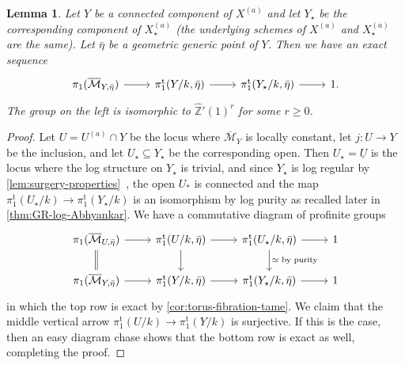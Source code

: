 \documentclass[a4paper,twoside,11pt,reqno]{amsart}
\renewcommand{\mathbb}{\mathds}
\newcommand{\cM}{{\mathcal M}}
\newcommand{\pitame}{\pi_1^{\mathrm{t}}}
\newtheorem{lem}[thm]{Lemma}
\theoremstyle{definition}
\numberwithin{equation}{subsection}
\begin{document}
\begin{lem} \label{lem:right-exact-Xa}
    Let $Y$ be a connected component of $X^{(a)}$ and let $Y_\star$ be the corresponding component of $X^{(a)}_\star$ (the underlying schemes of $X^{(a)}$ and $X^{(a)}_\star$ are the same). Let $\bar\eta$ be a geometric generic point of $Y$. Then we have an exact sequence
    \[
        \begin{tikzcd}
            \pi_1(\overline{\cM}_{Y,\bar\eta}) \ar[r] & \pitame(Y/k,\bar\eta)\ar[r] & \pitame(Y_\star/k,\bar\eta)\ar[r] & 1.
        \end{tikzcd}
    \]
    The group on the left is isomorphic to $\widehat{\mathbb{Z}}'(1)^r$ for some $r\geq 0$. 
\end{lem}

\begin{proof}
Let $U=U^{(a)}\cap Y$ be the locus where $\overline{\cM}_Y$ is locally constant, let $j\colon U\to Y$ be the inclusion, and let $U_\star\subseteq Y_\star$ be the corresponding open. Then $U_\star=\underline{U}$ is the locus where the log structure on $Y_\star$ is trivial, and since $Y_\star$ is log regular by \cref{lem:surgery-properties}~, the open $U_\ast$ is connected and the map $\pitame(U_\star/k)\to \pitame(Y_\star/k)$ is an isomorphism by log purity as recalled later in \cref{thm:GR-log-Abhyankar}. We have a commutative diagram of profinite groups
\[
    \begin{tikzcd}
            \pi_1(\overline{\cM}_{U,\bar\eta}) \ar[r] \ar[d,equal] & \pitame(U/k,\bar\eta)\ar[r] \ar[d] & \pitame(U_\star/k,\bar\eta)\ar[r] \ar[d,"\simeq\text{ by purity}"] & 1 \\
            \pi_1(\overline{\cM}_{Y,\bar\eta}) \ar[r] & \pitame(Y/k,\bar\eta)\ar[r] & \pitame(Y_\star/k,\bar\eta)\ar[r] & 1
    \end{tikzcd}
\]
in which the top row is exact by \cref{cor:torus-fibration-tame}. We claim that the middle vertical arrow $\pitame(U/k)\to\pitame(Y/k)$ is surjective. If this is the case, then an easy diagram chase shows that the bottom row is exact as well, completing the proof.


\end{proof}
\end{document}
